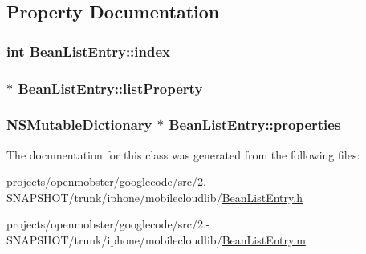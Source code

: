 \subsection{\-Property \-Documentation}
\hypertarget{interface_bean_list_entry_ae76e624597168e613d1ebd3cd5f80b70}{
\subsubsection[{index}]{\setlength{\rightskip}{0pt plus 5cm}int \-Bean\-List\-Entry\-::index}}
\label{interface_bean_list_entry_ae76e624597168e613d1ebd3cd5f80b70}
\hypertarget{interface_bean_list_entry_a720e55cdf8ee2d92ba676ff6af374ce5}{
\subsubsection[{list\-Property}]{ $\ast$ \-Bean\-List\-Entry\-::list\-Property}}
\label{interface_bean_list_entry_a720e55cdf8ee2d92ba676ff6af374ce5}
\hypertarget{interface_bean_list_entry_ae7c542cab9a4e914550b063f70afd434}{
\subsubsection[{properties}]{\setlength{\rightskip}{0pt plus 5cm}\-N\-S\-Mutable\-Dictionary $\ast$ \-Bean\-List\-Entry\-::properties}}
\label{interface_bean_list_entry_ae7c542cab9a4e914550b063f70afd434}


\-The documentation for this class was generated from the following files\-:\begin{DoxyCompactItemize}
\item 
projects/openmobster/googlecode/src/2.-\/\-S\-N\-A\-P\-S\-H\-O\-T/trunk/iphone/mobilecloudlib/\hyperlink{_bean_list_entry_8h}{\-Bean\-List\-Entry.\-h}\item 
projects/openmobster/googlecode/src/2.-\/\-S\-N\-A\-P\-S\-H\-O\-T/trunk/iphone/mobilecloudlib/\hyperlink{_bean_list_entry_8m}{\-Bean\-List\-Entry.\-m}\end{DoxyCompactItemize}
